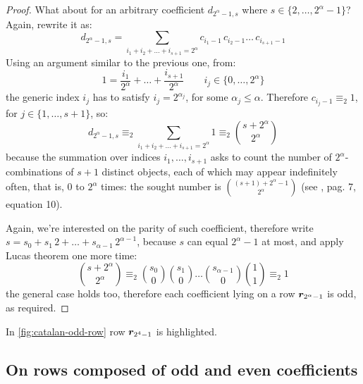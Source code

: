 \begin{proof}
    What about for an arbitrary coefficient $d_{2^{\alpha}-1,s}$ where
    $s\in\lbrace{2,\ldots,2^{\alpha}-1}\rbrace$?  Again, rewrite it as:
    \begin{displaymath}
        d_{2^{\alpha}-1,s} = \sum_{i_{1}+i_{2}+\ldots+i_{s+1}=2^{\alpha}}
            {c_{i_{1}-1}\,c_{i_{2}-1}\ldots\,c_{i_{s+1}-1}}
    \end{displaymath}
    Using an argument similar to the previous one, from:
    \begin{displaymath}
        1 = \frac{i_{1}}{2^{\alpha}}+\ldots+\frac{i_{s+1}}{2^{\alpha}} \qquad 
            i_{j}\in\lbrace 0,\ldots,2^{\alpha}\rbrace
    \end{displaymath} 
    the generic index $i_{j}$ has to satisfy $i_{j}=2^{\alpha_{j}}$, for some
    $\alpha_{j}\leq\alpha$. Therefore $c_{i_{j}-1}\equiv_{2}1$,
    for $j\in\lbrace1,\ldots,s+1\rbrace$, so:
    \begin{displaymath}
        d_{2^{\alpha}-1,s} \equiv_{2} \sum_{i_{1}+i_{2}+\ldots+i_{s+1}=2^{\alpha}}{1}
            \equiv_{2} {{s+2^{\alpha}}\choose{2^{\alpha}}}
    \end{displaymath}
    because the summation over indices $i_{1},\ldots,i_{s+1}$ asks to count the
    number of $2^{\alpha}$-combinations of $s+1$ distinct objects, each of
    which may appear indefinitely often, that is, $0$ to $2^{\alpha}$ times:
    the sought number is ${{(s+1)+2^{\alpha}-1}\choose{2^{\alpha}}}$
    (see \cite{riordan:intro:combinatorial:analysis}, pag. 7, equation 10).

    Again, we're interested on the parity of such coefficient, therefore
    write $s=s_{0}+s_{1}\,2+\ldots+s_{\alpha-1}\,2^{\alpha-1}$, because $s$ can equal 
    $2^{\alpha}-1$ at most, and apply Lucas theorem one more time:
    \begin{displaymath}
        {{s+2^{\alpha}}\choose{2^{\alpha}}}\equiv_{2} 
            {{s_{0}}\choose{0}}{{s_{1}}\choose{0}} \ldots
                {{s_{\alpha-1}}\choose{0}}{{1}\choose{1}}\equiv_{2}1 
    \end{displaymath}
    the general case holds too, therefore each coefficient lying on
    a row $\boldsymbol{r}_{2^{\alpha}-1}$ is odd, as required.
\end{proof}


In \autoref{fig:catalan-odd-row} row $\boldsymbol{r}_{2^{4}-1}$ is highlighted.

\subsection{On rows composed of odd and even coefficients}

